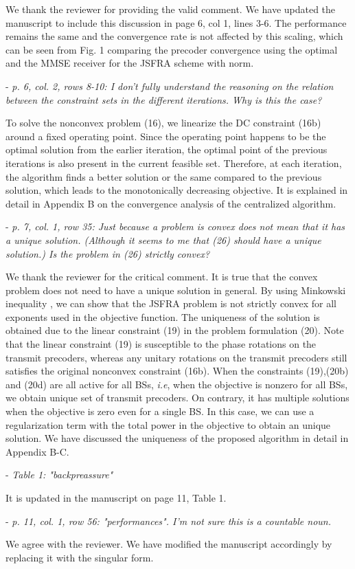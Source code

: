 \begin{itemize}
\begin{itemize}
\resp We thank the reviewer for providing the valid comment. We have updated the manuscript to include this discussion in page 6, col 1, lines 3-6. The performance remains the same and the convergence rate is not affected by this scaling, which can be seen from Fig. 1 comparing the precoder convergence using the optimal and the MMSE receiver for the JSFRA scheme with  norm.

 - \textit{p. 6, col. 2, rows 8-10: I don't fully understand the reasoning on the relation between the constraint sets in the different iterations. Why is this the case?}

\resp To solve the nonconvex problem (16), we linearize the DC constraint (16b) around a fixed operating point. Since the operating point happens to be the optimal solution from the earlier iteration, the optimal point of the previous iterations is also present in the current feasible set. Therefore, at each iteration, the algorithm finds a better solution or the same compared to the previous solution, which leads to the monotonically decreasing objective. It is explained in detail in Appendix B on the convergence analysis of the centralized algorithm.

 - \textit{p. 7, col. 1, row 35: Just because a problem is convex does not mean that it has a unique solution. (Although it seems to me that (26) should have a unique solution.) Is the problem in (26) strictly convex?}

\resp We thank the reviewer for the critical comment. It is true that the convex problem does not need to have a unique solution in general. By using Minkowski inequality , we can show that the JSFRA problem is not strictly convex for all exponents  used in the objective function. The uniqueness of the solution is obtained due to the linear constraint (19) in the problem formulation (20). Note that the linear constraint (19) is susceptible to the phase rotations on the transmit precoders, whereas any unitary rotations on the transmit precoders still satisfies the original nonconvex constraint (16b). When the constraints (19),(20b) and (20d) are all active for all BSs, \textit{i.e}, when the objective is nonzero for all BSs, we obtain unique set of transmit precoders. On contrary, it has multiple solutions when the objective is zero even for a single BS. In this case, we can use a regularization term with the total power in the objective to obtain an unique solution. We have discussed the uniqueness of the proposed algorithm in detail in Appendix B-C.

 - \textit{Table 1: "backpreassure"}

\resp It is updated in the manuscript on page 11, Table 1.

 - \textit{p. 11, col. 1, row 56: "performances". I'm not sure this is a countable noun.}

\resp We agree with the reviewer. We have modified the manuscript accordingly by replacing it with the singular form.

\end{itemize}

\end{itemize}
